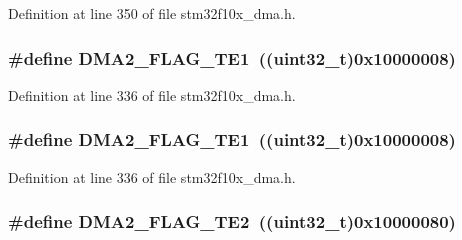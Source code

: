 Definition at line 350 of file stm32f10x\+\_\+dma.\+h.

\subsubsection[{\texorpdfstring{D\+M\+A2\+\_\+\+F\+L\+A\+G\+\_\+\+T\+E1}{DMA2_FLAG_TE1}}]{\setlength{\rightskip}{0pt plus 5cm}\#define D\+M\+A2\+\_\+\+F\+L\+A\+G\+\_\+\+T\+E1~(({\bf uint32\+\_\+t})0x10000008)}\hypertarget{group___d_m_a__flags__definition_ga415793b309369076a9d797ad0757a9c1}{}\label{group___d_m_a__flags__definition_ga415793b309369076a9d797ad0757a9c1}


Definition at line 336 of file stm32f10x\+\_\+dma.\+h.

\subsubsection[{\texorpdfstring{D\+M\+A2\+\_\+\+F\+L\+A\+G\+\_\+\+T\+E1}{DMA2_FLAG_TE1}}]{\setlength{\rightskip}{0pt plus 5cm}\#define D\+M\+A2\+\_\+\+F\+L\+A\+G\+\_\+\+T\+E1~(({\bf uint32\+\_\+t})0x10000008)}\hypertarget{group___d_m_a__flags__definition_ga415793b309369076a9d797ad0757a9c1}{}\label{group___d_m_a__flags__definition_ga415793b309369076a9d797ad0757a9c1}


Definition at line 336 of file stm32f10x\+\_\+dma.\+h.

\subsubsection[{\texorpdfstring{D\+M\+A2\+\_\+\+F\+L\+A\+G\+\_\+\+T\+E2}{DMA2_FLAG_TE2}}]{\setlength{\rightskip}{0pt plus 5cm}\#define D\+M\+A2\+\_\+\+F\+L\+A\+G\+\_\+\+T\+E2~(({\bf uint32\+\_\+t})0x10000080)}\hypertarget{group___d_m_a__flags__definition_ga3d396b14851e789ad549126da55b7f3f}{}\label{group___d_m_a__flags__definition_ga3d396b14851e789ad549126da55b7f3f}


